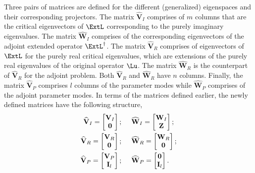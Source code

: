 Three pairs of matrices are defined for the different (generalized) eigenspaces and their corresponding projectors. The matrix $\mathbf{\widehat{V}}_{I}$ comprises of $m$ columns that are the critical eigenvectors of $\ExtL$ corresponding to the purely imaginary eigenvalues. The matrix $\mathbf{\widehat{W}}_{I}$ comprises of the corresponding eigenvectors of the adjoint extended operator $\ExtL^{\dagger}$. The matrix $\mathbf{\widehat{V}}_{R}$ comprises of eigenvectors of $\ExtL$ for the purely real critical eigenvalues, which are extensions of the purely real eigenvalues of the original operator $\Lu$. The matrix $\mathbf{\widehat{W}}_{R}$ is the counterpart of $\mathbf{\widehat{V}}_{R}$ for the adjoint problem. Both $\mathbf{\widehat{V}}_{R}$ and $\mathbf{\widehat{W}}_{R}$ have $n$ columns. 
Finally, the matrix $\mathbf{\widehat{V}}_{P}$ comprises $l$ columns of the parameter modes while $\mathbf{\widehat{W}}_{P}$ comprises of the adjoint parameter modes. In terms of the matrices defined earlier, the newly defined matrices have the following structure, 
\begin{subequations}
	\begin{align}
		\mathbf{\widehat{V}}_{I} = \begin{bmatrix}
			\mathbf{V}_{I} \\ 
			\mathbf{0}
		\end{bmatrix}; \hspace{5mm} &
		\mathbf{\widehat{W}}_{I} = \begin{bmatrix}
			\mathbf{W}_{I} \\ 
			\mathbf{Z}
		\end{bmatrix}; \\
		\mathbf{\widehat{V}}_{R} = \begin{bmatrix}
			\mathbf{V}_{R} \\ 
			\mathbf{0}
		\end{bmatrix}; \hspace{5mm} &
		\mathbf{\widehat{W}}_{R} = \begin{bmatrix}
			\mathbf{W}_{R} \\ 
			\mathbf{0}
		\end{bmatrix}; \\
		\mathbf{\widehat{V}}_{P} = \begin{bmatrix}
			\mathbf{V}_{P} \\ 
			\mathbf{I}_{l}
		\end{bmatrix}; \hspace{5mm} &
		\mathbf{\widehat{W}}_{P} = \begin{bmatrix}
			\mathbf{0} \\ 
			\mathbf{I}_{l}
		\end{bmatrix}.
	\end{align}
\end{subequations}
